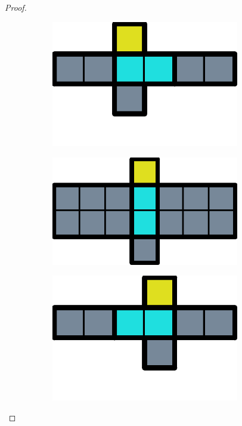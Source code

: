 \begin{proof}
\begin{figure}[ht]
\begin{subfigure}[b]{0.15\textwidth}
    \includegraphics[width=0.9\textwidth]{./pictures/dominoes/proff-floating/scenario-3.pdf}
    \caption{}
    \label{floating:c}
  \end{subfigure}
  \begin{subfigure}[b]{0.15\textwidth}
    \centering
    \includegraphics[width=0.9\textwidth]{./pictures/dominoes/proff-floating/scenario-4.pdf}
    \caption{}
    \label{floating:d}
  \end{subfigure}
  \begin{subfigure}[b]{0.15\textwidth}
    \centering
    \includegraphics[width=0.9\textwidth]{./pictures/dominoes/proff-floating/scenario-5.pdf}

\end{subfigure}
\end{figure}
\end{proof}
